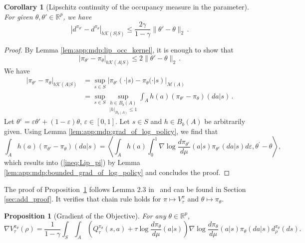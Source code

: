 \documentclass{amsart}
\newtheorem{proposition}{Proposition}
\newtheorem{corollary}{Corollary}
\theoremstyle{definition}
\begin{document}
\begin{corollary}[Lipschitz continuity of the occupancy measure in the parameter]\label{cor:app:mdp:Lip_occ}
For given $\theta,\theta' \in \mathbb{R}^p$, we have
\[
|d^{\pi_{\theta'}}-d^{\pi_{\theta}}|_{b\mathcal{K}(S|S)}\le \frac{2\gamma}{1-\gamma}\|\theta' - \theta\|_2\,.
\]
\end{corollary}
\begin{proof}
By Lemma \ref{lem:app:mdp:lip_occ_kernel}, it is enough to show that
\begin{equation}\label{ineq:Lip_pi}
|\pi_{\theta'}-\pi_{\theta}|_{b\mathcal{K}(A|S)} \le 2\|\theta' - \theta\|_2\,.
\end{equation}
We have 
\begin{align*}
|\pi_{\theta'}-\pi_{\theta}|_{b\mathcal{K}(A|S)}&=\sup_{s\in S}|\pi_{\theta'}(\cdot|s)-\pi_{\theta}(\cdot|s)|_{\mathcal{M}(A)}\\
&=\sup_{s\in S}\underset{|h|_{B_b(A)}\le 1}{\sup_{h\in B_b(A)}}\int_{A}h(a)\left(\pi_{\theta'}-\pi_{\theta}\right)(da|s)\,.
\end{align*}
Let $\theta^{\varepsilon}=\varepsilon \theta'+(1-\varepsilon)\theta$, $\varepsilon\in [0,1]$. Let $s\in S$ and $h\in B_b(A)$ be arbitrarily given. 
Using Lemma \ref{lem:app:mdp:grad_of_log_policy}, we find that 
\[
\int_{A}h(a)\left(\pi_{\theta'}-\pi_{\theta}\right)(da|s)= \left\langle\int_{A} h(a)\int_0^1 \nabla \log \frac{d \pi_{\theta^\varepsilon}}{d \mu} (a|s) \pi_{\theta^\varepsilon}(da|s)d\varepsilon, \theta^\prime - \theta\right\rangle,
\]
which results into (\ref{ineq:Lip_pi}) by Lemma \ref{lem:app:mdp:bounded_grad_of_log_policy} and concludes the proof.
\end{proof}

The proof of Proposition~\ref{prp:app:mdp:Gradient_of_the_Objective} follows Lemma 2.3 in~\cite{leahy2022convergence} and can be found in Section \ref{sec:add_proof}.
It verifies that chain rule holds for $\pi \mapsto V^\pi_\tau$ and $\theta \mapsto \pi_\theta$.

\begin{proposition}[Gradient of the Objective]\label{prp:app:mdp:Gradient_of_the_Objective} 
For any $\theta \in \mathbb{R}^p$, 
\begin{equation}\label{eq:wts_func_deriv_V}
\nabla V_\tau^{\pi_\theta}(\rho) = \frac{1}{1-\gamma}\int_S\int_A \left(Q^{\pi_\theta}_\tau(s,a) + \tau \log \frac{d \pi_{\theta}}{d \mu}(a|s)\right)\nabla \log \frac{d\pi_\theta}{d \mu}(a| s)\pi_{\theta}(da|s)d_\rho^{\pi_{\theta}}(ds).
\end{equation}
\end{proposition}
\end{document}
